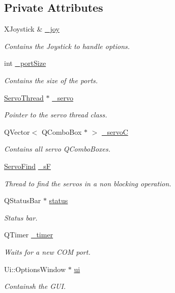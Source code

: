 \subsection*{Private Attributes}
\begin{DoxyCompactItemize}
\item 
X\+Joystick \& \hyperlink{a00006_a1bf846ab681ab245f70adac30999947c}{\+\_\+joy}
\begin{DoxyCompactList}\small\item\em Contains the Joystick to handle options. \end{DoxyCompactList}\item 
int \hyperlink{a00006_a9bd4dccc7a544b1db78dc8cf330b88f6}{\+\_\+port\+Size}
\begin{DoxyCompactList}\small\item\em Contains the size of the ports. \end{DoxyCompactList}\item 
\hyperlink{a00009}{Servo\+Thread} $\ast$ \hyperlink{a00006_acba1566fea3f831000d5e1c1edc3e776}{\+\_\+servo}
\begin{DoxyCompactList}\small\item\em Pointer to the servo thread class. \end{DoxyCompactList}\item 
Q\+Vector$<$ Q\+Combo\+Box $\ast$ $>$ \hyperlink{a00006_a45137fbf71bbee10e171019c913b88b7}{\+\_\+servo\+C}
\begin{DoxyCompactList}\small\item\em Contains all servo Q\+Combo\+Boxes. \end{DoxyCompactList}\item 
\hyperlink{a00008}{Servo\+Find} \hyperlink{a00006_ab143e1d06250ec778309da1a3807b602}{\+\_\+s\+F}
\begin{DoxyCompactList}\small\item\em Thread to find the servos in a non blocking operation. \end{DoxyCompactList}\item 
Q\+Status\+Bar $\ast$ \hyperlink{a00006_af031403c7017cf086c0b85186c53471e}{status}
\begin{DoxyCompactList}\small\item\em Status bar. \end{DoxyCompactList}\item 
Q\+Timer \hyperlink{a00006_af6320942b8558140989f552b3bbc1fbd}{\+\_\+timer}
\begin{DoxyCompactList}\small\item\em Waits for a new C\+O\+M port. \end{DoxyCompactList}\item 
Ui\+::\+Options\+Window $\ast$ \hyperlink{a00006_a8347442d5b3b670e8fff0c4102db1f88}{ui}
\begin{DoxyCompactList}\small\item\em Containsh the G\+U\+I. \end{DoxyCompactList}\end{DoxyCompactItemize}


